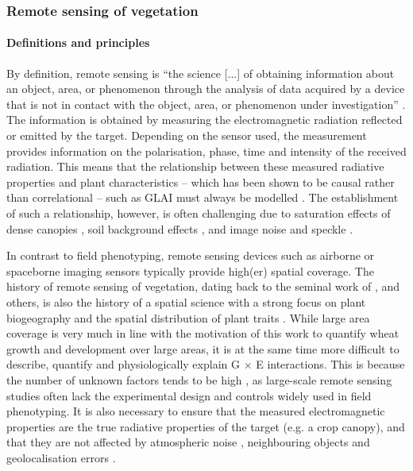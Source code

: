 \subsubsection{Remote sensing of vegetation}
\label{subsubsec:intor-rs-veg}
\paragraph{Definitions and principles}
By definition, remote sensing is ``the science [...] of obtaining information about an object, area, or phenomenon through the analysis of data acquired by a device that is not in contact with the object, area, or phenomenon under investigation'' \citep[p. 1]{lillesand_remote_2015}. The information is obtained by measuring the electromagnetic radiation reflected or emitted by the target. Depending on the sensor used, the measurement provides information on the polarisation, phase, time and intensity of the received radiation. This means that the relationship between these measured radiative properties and plant characteristics -- which \cite{kattenborn_radiative_2019} has been shown to be causal rather than correlational -- such as \gls{GLAI} must always be modelled \citep{weiss_remote_2020}. The establishment of such a relationship, however, is often challenging due to saturation effects of dense canopies \citep{mutanga_spectral_2023}, soil background effects \citep{qi_modified_1994}, and image noise and speckle \citep{boncelet_image_2009}.

In contrast to field phenotyping, remote sensing devices such as airborne or spaceborne imaging sensors typically provide high(er) spatial coverage. The history of remote sensing of vegetation, dating back to the seminal work of \cite{rouse_monitoring_1974}, \cite{aase_assessing_1981} and others, is also the history of a spatial science \citep{goodchild_geographical_1992} with a strong focus on plant biogeography and the spatial distribution of plant traits \citep{millington_gis_2001}. While large area coverage is very much in line with the motivation of this work to quantify wheat growth and development over large areas, it is at the same time more difficult to describe, quantify and physiologically explain G $\times$ E interactions. This is because the number of unknown factors tends to be high \citep{helman_land_2018}, as large-scale remote sensing studies often lack the experimental design and controls widely used in field phenotyping. It is also necessary to ensure that the measured electromagnetic properties are the true radiative properties of the target (e.g. a crop canopy), and that they are not affected by atmospheric noise \citep{eklundh_noise_1995}, neighbouring objects \citep{wang_adaptive_2021} and geolocalisation errors \citep{yan_sentinel-2a_2018}.

